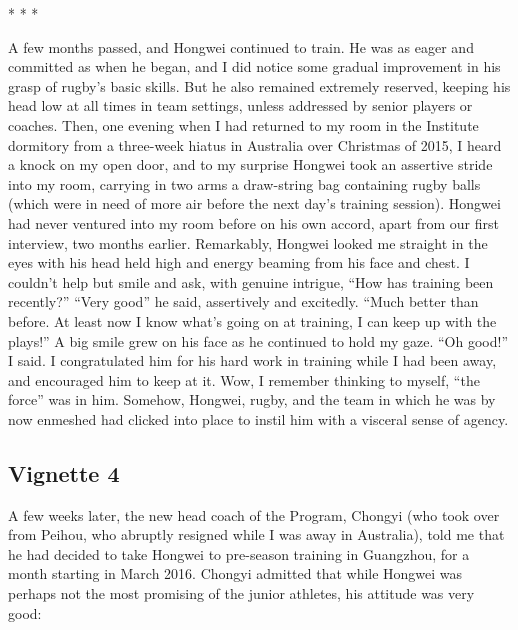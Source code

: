 \begin{CJK}{UTF8}{gbsn}
\begin{center}
  * * *
\end{center}


A few months passed, and Hongwei continued to train.  He was as eager and committed as when he began, and I did notice some gradual improvement in his grasp of rugby's basic skills.  But he also remained extremely reserved, keeping his head low at all times in team settings, unless addressed by senior players or coaches.  Then, one evening when I had returned to my room in the Institute dormitory from a three-week hiatus in Australia over Christmas of 2015, I heard a knock on my open door, and to my surprise Hongwei took an assertive stride into my room, carrying in two arms a draw-string bag containing rugby balls (which were in need of more air before the next day's training session).  Hongwei had never ventured into my room before on his own accord, apart from our first interview, two months earlier.  Remarkably, Hongwei looked me straight in the eyes with his head held high and energy beaming from his face and chest. I couldn't help but smile and ask, with genuine intrigue, ``How has training been recently?''
``Very good'' he said, assertively and excitedly.  ``Much better than before.  At least now I know what’s going on at training, I can keep up with the plays!''  A big smile grew on his face as he continued to hold my gaze.  ``Oh good!'' I said. I congratulated him for his hard work in training while I had been away, and encouraged him to keep at it. Wow, I remember thinking to myself, ``the force'' was in him.  Somehow, Hongwei, rugby, and the team in which he was by now enmeshed had clicked into place to instil him with a visceral sense of agency.

\subsection{Vignette 4}
A few weeks later, the new head coach of the Program, Chongyi (who took over from Peihou, who abruptly resigned while I was away in Australia), told me that he had decided to take Hongwei to pre-season training in Guangzhou, for a month starting in March 2016.  Chongyi admitted that while Hongwei was perhaps not the most promising of the junior athletes, his attitude was very good:



\end{CJK}
